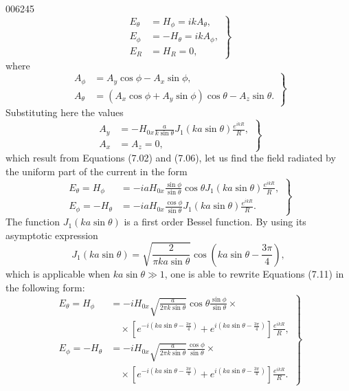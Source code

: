 \begin{scanpage}{0062}{45}
\[\left.\begin{aligned}E_\theta&=H_\phi=ikA_\theta,\\E_\phi&=-H_\theta=ikA_\phi,\\E_R&=H_R=0,\end{aligned}\right\}\tag{7.08}\]
where
\[\left.\begin{aligned}A_\phi&=A_y\cos\phi-A_x\sin\phi,\\A_\theta&=(A_x\cos\phi+A_y\sin\phi)\cos\theta-A_z\sin\theta.\end{aligned}\right\}\tag{7.09}\]
Substituting here the values
\[\left.\begin{aligned}A_y&=-H_{0x}\frac a{k\sin\theta}J_1(ka\sin\theta)\frac{e^{ikR}}R,\\A_x&=A_z=0,\end{aligned}\right\}\tag{7.10}\]
which result from Equations (7.02) and (7.06), let us find the field radiated by the uniform part of the current in the form
\[\left.\begin{aligned}E_\theta=H_\phi&=-iaH_{0x}\frac{\sin\phi}{\sin\theta}\cos\theta J_1(ka\sin\theta)\frac{e^{ikR}}R,\\E_\phi=-H_\theta&=-iaH_{0x}\frac{\cos\phi}{\sin\theta}J_1(ka\sin\theta)\frac{e^{ikR}}R.\end{aligned}\right\}\tag{7.11}\]
The function $J_1(ka\sin\theta)$ is a first order Bessel function. By using its asymptotic expression
\[J_1(ka\sin\theta)=\sqrt{\frac2{\pi ka\sin\theta}}\cos\left(ka\sin\theta-\frac{3\pi}4\right),\tag{7.12}\]
which is applicable when $ka\sin\theta\gg1$, one is able to rewrite Equations (7.11) in the following form:
\[\left.\begin{aligned}E_\theta=H_\phi&=-iH_{0x}\sqrt{\frac a{2\pi k\sin\theta}}\cos\theta\frac{\sin\phi}{\sin\theta}\times\\&\quad\times\left[e^{-i(ka\sin\theta-\frac{3\pi}4)}+e^{i(ka\sin\theta-\frac{3\pi}4)}\right]\frac{e^{ikR}}R,\\E_\phi=-H_\theta&=-iH_{0x}\sqrt{\frac a{2\pi k\sin\theta}}\frac{\cos\phi}{\sin\theta}\times\\&\quad\times\left[e^{-i(ka\sin\theta-\frac{3\pi}4)}+e^{i(ka\sin\theta-\frac{3\pi}4)}\right]\frac{e^{ikR}}R.\end{aligned}\right\}\tag{7.13}\]
\end{scanpage}
